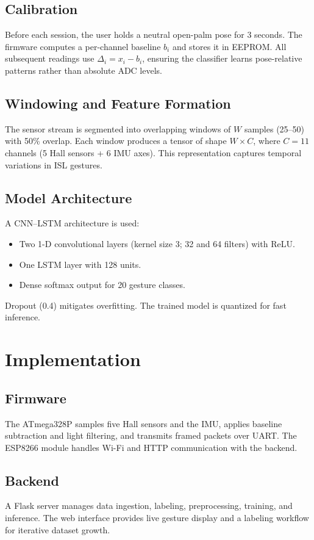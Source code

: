 \documentclass[12pt,a4paper]{report}
\begin{document}
\section{Calibration}
Before each session, the user holds a neutral open-palm pose for 3 seconds. The
firmware computes a per-channel baseline $b_i$ and stores it in EEPROM. All
subsequent readings use $\Delta_i = x_i - b_i$, ensuring the classifier learns
pose-relative patterns rather than absolute ADC levels.

\section{Windowing and Feature Formation}
The sensor stream is segmented into overlapping windows of $W$ samples (25--50)
with 50\% overlap. Each window produces a tensor of shape $W \times C$, where
$C=11$ channels (5 Hall sensors + 6 IMU axes). This representation captures
temporal variations in ISL gestures.

\section{Model Architecture}
A CNN--LSTM architecture is used:
\begin{itemize}[noitemsep]
  \item Two 1-D convolutional layers (kernel size 3; 32 and 64 filters) with ReLU.
  \item One LSTM layer with 128 units.
  \item Dense softmax output for 20 gesture classes.
\end{itemize}
Dropout (0.4) mitigates overfitting. The trained model is quantized for fast
inference.

\chapter{Implementation}
\section{Firmware}
The ATmega328P samples five Hall sensors and the IMU, applies baseline
subtraction and light filtering, and transmits framed packets over UART. The
ESP8266 module handles Wi-Fi and HTTP communication with the backend.

\section{Backend}
A Flask server manages data ingestion, labeling, preprocessing, training, and
inference. The web interface provides live gesture display and a labeling
workflow for iterative dataset growth.
\end{document}
